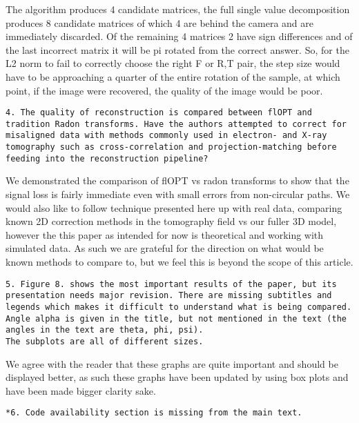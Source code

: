 \documentclass[12pt]{report}
\begin{document}
The algorithm produces 4 candidate matrices, the full single value decomposition produces 8 candidate matrices of which 4 are behind the camera and are immediately discarded. Of the remaining 4 matrices 2 have sign differences and of the last incorrect matrix it will be pi rotated from the correct answer. So, for the L2 norm to fail to correctly choose the right F or R,T pair, the step size would have to be approaching a quarter of the entire rotation of the sample, at which point, if the image were recovered, the quality of the image would be poor.

\begin{lstlisting}
4. The quality of reconstruction is compared between flOPT and tradition Radon transforms. Have the authors attempted to correct for misaligned data with methods commonly used in electron- and X-ray tomography such as cross-correlation and projection-matching before feeding into the reconstruction pipeline?
\end{lstlisting}

We demonstrated the comparison of flOPT vs radon transforms to show that the signal loss is fairly immediate even with small errors from non-circular paths. We would also like to follow technique presented here up with real data, comparing known 2D correction methods in the tomography field vs our fuller 3D model, however the this paper as intended for now is theoretical and working with simulated data. As such we are grateful for the direction on what would be known methods to compare to, but we feel this is beyond the scope of this article.

\begin{lstlisting}
5. Figure 8. shows the most important results of the paper, but its presentation needs major revision. There are missing subtitles and legends which makes it difficult to understand what is being compared. Angle alpha is given in the title, but not mentioned in the text (the angles in the text are theta, phi, psi).
The subplots are all of different sizes.
\end{lstlisting}

We agree with the reader that these graphs are quite important and should be displayed better, as such these graphs have been updated by using box plots and have been made bigger clarity sake.

\begin{lstlisting}
*6. Code availability section is missing from the main text.
\end{lstlisting}
\end{document}
